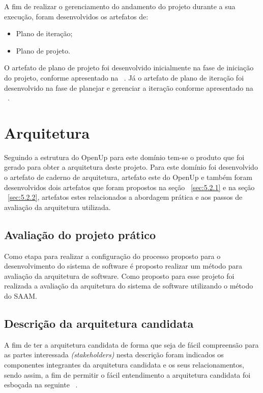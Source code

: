 A fim de realizar o gerenciamento do andamento do projeto durante a sua execução, foram desenvolvidos os artefatos de: 
\begin{itemize}
    \item Plano de iteração;
    \item Plano de projeto.
\end{itemize}

O artefato de plano de projeto foi desenvolvido inicialmente na fase de iniciação do projeto, conforme apresentado na ~. Já o artefato de plano de iteração foi desenvolvido na fase de planejar e gerenciar a iteração conforme apresentado na ~.
\section{Arquitetura}
\label{sec:arquitetura}

Seguindo a estrutura do \acrfull{OpenUp} para este domínio tem-se  o produto que foi gerado para obter a arquitetura deste projeto. Para este domínio foi desenvolvido o artefato de caderno de arquitetura, artefato este do \acrfull{OpenUp} e também foram desenvolvidos dois artefatos que foram propostos na seção ~\ref{sec:5.2.1} e na seção ~\ref{sec:5.2.2}, artefatos estes relacionados a abordagem prática e aos passos de avaliação da arquitetura utilizada.

\subsection{Avaliação do projeto prático}

Como etapa para realizar a configuração do processo proposto para o desenvolvimento do sistema de software é proposto realizar um método para avaliação da arquitetura de software. Como proposto para esse projeto foi realizada a avaliação da arquitetura do sistema de software utilizando o método do \acrfull{SAAM}.

\subsection{Descrição da arquitetura candidata}

A fim de ter a arquitetura candidata de forma que seja de fácil compreensão para as partes interessada \emph{(stakeholders)} nesta descrição foram indicados os componentes integrantes da arquitetura candidata e os seus relacionamentos, sendo assim, a fim de permitir o fácil entendimento a arquitetura candidata foi esboçada na seguinte ~.

